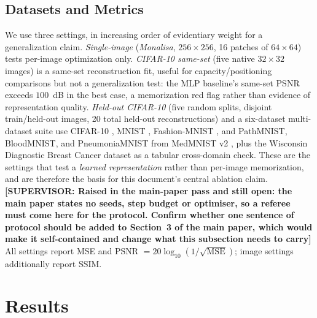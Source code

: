 \documentclass[11pt]{article}
\begin{document}
\subsection{Datasets and Metrics}
We use three settings, in increasing order of evidentiary weight for a generalization claim. \textit{Single-image} (\textit{Monalisa}, $256\times256$, 16 patches of $64\times64$) tests per-image optimization only. \textit{CIFAR-10 same-set} (five native $32\times32$ images) is a same-set reconstruction fit, useful for capacity/positioning comparisons but not a generalization test: the MLP baseline's same-set PSNR exceeds $100$~dB in the best case, a memorization red flag rather than evidence of representation quality. \textit{Held-out CIFAR-10} (five random splits, disjoint train/held-out images, 20 total held-out reconstructions) and a six-dataset multi-dataset suite use CIFAR-10 \cite{Krizhevsky2009}, MNIST \cite{LeCun1998}, Fashion-MNIST \cite{Xiao2017}, and PathMNIST, BloodMNIST, and PneumoniaMNIST from MedMNIST v2 \cite{Yang2023}, plus the Wisconsin Diagnostic Breast Cancer dataset \cite{Wolberg1993} as a tabular cross-domain check. These are the settings that test a \emph{learned representation} rather than per-image memorization, and are therefore the basis for this document's central ablation claim. {\color{red}\textbf{[SUPERVISOR: Raised in the main-paper pass and still open: the main paper states no seeds, step budget or optimiser, so a referee must come here for the protocol. Confirm whether one sentence of protocol should be added to Section~3 of the main paper, which would make it self-contained and change what this subsection needs to carry]}} All settings report MSE and PSNR $=20\log_{10}(1/\sqrt{\mathrm{MSE}})$; image settings additionally report SSIM.

\section{Results}
\label{sec:results}
\end{document}
